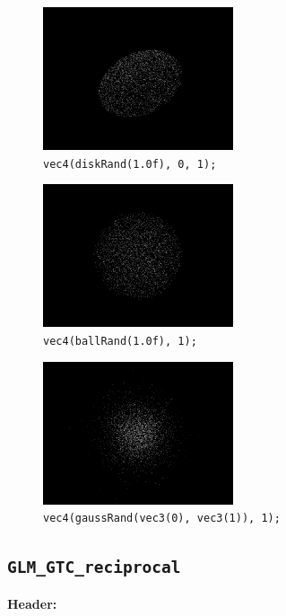 \documentclass{scrartcl}
\numberwithin{figure}{subsection}
\begin{document}
\begin{figure}[h]
  \centering
  \includegraphics[width=0.5\textwidth]{diskrand}
  \cprotect\caption{\verb|vec4(diskRand(1.0f), 0, 1);|}
\end{figure}

\begin{figure}[h]
  \centering
  \includegraphics[width=0.5\textwidth]{ballrand}
  \cprotect\caption{\verb|vec4(ballRand(1.0f), 1);|}
\end{figure}

\begin{figure}[h]
  \centering
  \includegraphics[width=0.5\textwidth]{gaussrand}
  \cprotect\caption{\verb|vec4(gaussRand(vec3(0), vec3(1)), 1);|}
\end{figure}

\subsection{\texttt{GLM\_GTC\_reciprocal}}
\textbf{Header:} 
\end{document}
